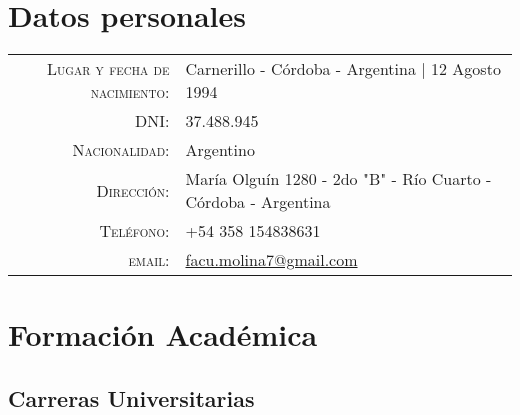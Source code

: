 \documentclass[a4paper,10pt]{article} %
\begin{document}
\pagestyle{empty} %


\par{\bigskip\par} %

\section{Datos personales}

\begin{tabular}{rl}
\\
\textsc{Lugar y fecha de nacimiento:} & Carnerillo - Córdoba - Argentina | 12 Agosto 1994 \\
\textsc{DNI:} & 37.488.945 \\
\textsc{Nacionalidad:} & Argentino \\
\textsc{Dirección:} & María Olguín 1280 - 2do "B" - Río Cuarto - Córdoba - Argentina\\
\textsc{Teléfono:} & +54 358 154838631\\
\textsc{email:} & \href{mailto:facu.molina7@gmail.com}{facu.molina7@gmail.com}
\end{tabular}


\section{Formación Académica}

\subsection{Carreras Universitarias}
\end{document}
